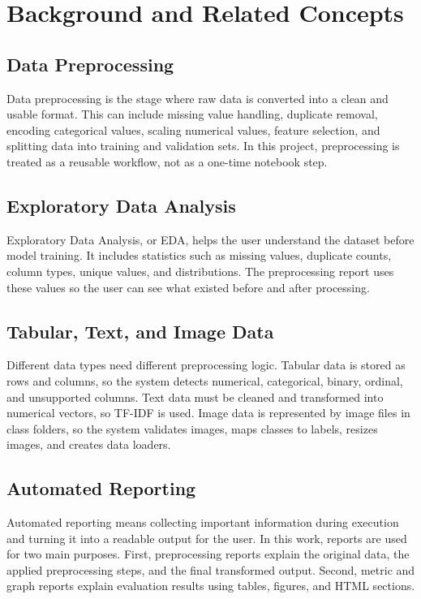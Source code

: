\documentclass[12pt,a4paper,oneside]{report}
\begin{document}
\chapter{Background and Related Concepts}
\label{chap:background}

\section{Data Preprocessing}

Data preprocessing is the stage where raw data is converted into a clean and
usable format. This can include missing value handling, duplicate removal,
encoding categorical values, scaling numerical values, feature selection, and
splitting data into training and validation sets. In this project,
preprocessing is treated as a reusable workflow, not as a one-time notebook
step.

\section{Exploratory Data Analysis}

Exploratory Data Analysis, or EDA, helps the user understand the dataset before
model training. It includes statistics such as missing values, duplicate
counts, column types, unique values, and distributions. The preprocessing report
uses these values so the user can see what existed before and after processing.

\section{Tabular, Text, and Image Data}

Different data types need different preprocessing logic. Tabular data is stored
as rows and columns, so the system detects numerical, categorical, binary,
ordinal, and unsupported columns. Text data must be cleaned and transformed
into numerical vectors, so TF-IDF is used. Image data is represented by image
files in class folders, so the system validates images, maps classes to labels,
resizes images, and creates data loaders.

\section{Automated Reporting}

Automated reporting means collecting important information during execution and
turning it into a readable output for the user. In this work, reports are used
for two main purposes. First, preprocessing reports explain the original data,
the applied preprocessing steps, and the final transformed output. Second,
metric and graph reports explain evaluation results using tables, figures, and
HTML sections.
\end{document}
